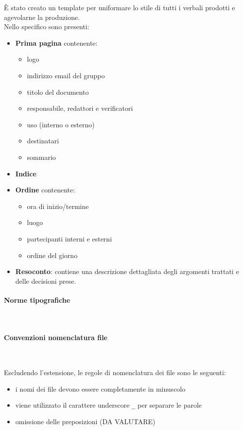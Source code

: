         È stato creato un template per uniformare lo stile di tutti i verbali prodotti e agevolarne la produzione.\\
        Nello specifico sono presenti:
        \begin{itemize}
            \item \textbf{Prima pagina} contenente:
            \begin {itemize} 
                \item logo
                \item indirizzo email del gruppo
                \item titolo del documento
                \item responsabile, redattori e verificatori
                \item uso (interno o esterno)
                \item destinatari
                \item sommario
            \end{itemize}
            \item \textbf{Indice}
            \item \textbf{Ordine} contenente:
            \begin {itemize} 
                \item ora di inizio/termine
                \item luogo
                \item partecipanti interni e esterni
                \item ordine del giorno
            \end{itemize}
            \item \textbf{Resoconto}: contiene una descrizione dettagliata degli argomenti trattati e delle decisioni prese.
        \end{itemize}

        \paragraph{Norme tipografiche} ~

        \paragraph{Convenzioni nomenclatura file} ~

        Escludendo l'estensione, le regole di nomenclatura dei file sono le seguenti:
            \begin{itemize}
                \item i nomi dei file devono essere completamente in minuscolo
                \item viene utilizzato il carattere underscore \texttt{\_} per separare le parole
                \item omissione delle preposizioni (DA VALUTARE)
            \end{itemize}

